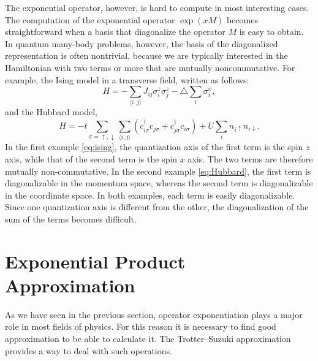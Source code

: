 The exponential operator, however, is hard to compute in most interesting cases. The computation of the exponential operator $\exp{(xM)}$ becomes straightforward when a basis that diagonalize the operator $M$ is easy to obtain. In quantum many-body problems, however, the basis of the diagonalized representation is often nontrivial, because we are typically interested in the Hamiltonian with two terms or more that are mutually noncommutative. For example, the Ising model in a transverse field, written as follows:
\begin{equation} \label{eq:ising}
H = -\sum_{\langle i,j \rangle} J_{ij} \sigma_i^z \sigma_j^z - \triangle\sum_i \sigma_i^x ,
\end{equation}
and the Hubbard model,
\begin{equation} \label{eq:Hubbard}
H = -t \sum_{\sigma = \uparrow ,\downarrow} \sum_{\langle i,j \rangle} (c_{i\sigma}^\dagger c_{j\sigma} + c_{j\sigma}^\dagger c_{i\sigma}) + U\sum_i n_{i\uparrow} n_{i\downarrow} .
\end{equation}
In the first example \eqref{eq:ising}, the quantization axis of the first term is the spin $z$ axis, while that of the second term is the spin $x$ axis. The two terms are therefore mutually non-commutative. In the second example \eqref{eq:Hubbard}, the first term is diagonalizable in the momentum space, whereas the second term is diagonalizable in the coordinate space. In both examples, each term is easily diagonalizable. Since one quantization axis is different from the other, the diagonalization of the sum of the terms becomes difficult.

\section{Exponential Product Approximation}
As we have seen in the previous section, operator exponentiation plays a major role in most fields of physics. For this reason it is necessary to find good approximation to be able to calculate it. The Trotter--Suzuki approximation provides a way to deal with such operations. 

